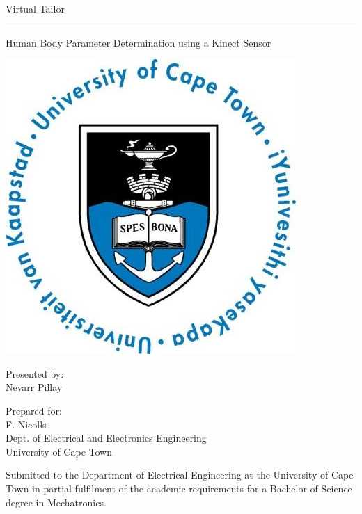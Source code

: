 \documentclass[a4paper,12pt]{report}
\begin{document}
 
\thispagestyle{empty}
{\Huge \begin{center}
Virtual Tailor
\hrule 
{\Large Human Body Parameter Determination using a Kinect Sensor}
\end{center}}

\vskip 5mm
\begin{center}
\- \- \- \- \- \- \- \- \- \- \includegraphics[scale = 0.3]{uctLogo.png}
\end{center}

\vskip 5mm
\begin{center}
Presented by:\\
Nevarr Pillay	%
\end{center}

\vskip 10mm
\begin{center}
Prepared for:\\
F. Nicolls\\ 		%
Dept. of Electrical and Electronics Engineering\\University of Cape Town
\end{center}


\vskip 10mm
\begin{center}
Submitted to the Department of Electrical Engineering at the University of Cape Town in partial
fulfilment of the academic requirements for a Bachelor of Science degree in Mechatronics.
\end{center}
\end{document}
